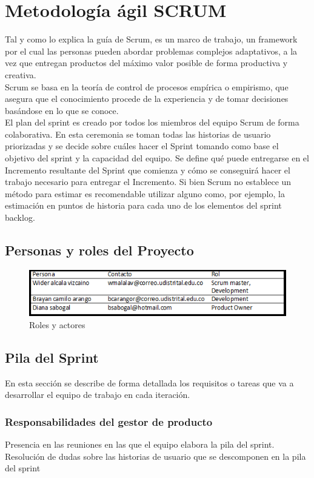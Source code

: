 \section{Metodología ágil SCRUM}

{Tal y como lo explica la guía de Scrum, es un marco de trabajo, un framework por el cual las personas pueden abordar problemas complejos adaptativos, a la vez que entregan productos del máximo valor posible de forma productiva y creativa.\\
	
Scrum se basa en la teoría de control de procesos empírica o empirismo, que asegura que el conocimiento procede de la experiencia y de tomar decisiones basándose en lo que se conoce.\\

El plan del sprint es creado por todos los miembros del equipo Scrum de forma colaborativa. En esta ceremonia se toman todas las historias de usuario priorizadas y se decide sobre cuáles hacer el Sprint tomando como base el objetivo del sprint y la capacidad del equipo. Se define qué puede entregarse en el Incremento resultante del Sprint que comienza y cómo se conseguirá hacer el trabajo necesario para entregar el Incremento. Si bien Scrum no establece un método para estimar es recomendable utilizar alguno como, por ejemplo, la estimación en puntos de historia para cada uno de los elementos del sprint backlog.

	\subsection{Personas y roles del Proyecto}
	{\begin{figure}[H]
		\centering
		\includegraphics[width=1\linewidth]{development/roles.png}
		\caption{Roles y actores}
	\end{figure}}

	\subsection{Pila del Sprint}
	{En esta sección se describe de forma detallada los requisitos o tareas que va a desarrollar el equipo de trabajo en cada iteración.
	
		\subsubsection{Responsabilidades del gestor de producto}
		{Presencia en las reuniones en las que el equipo elabora la pila del sprint. Resolución de dudas sobre las historias de usuario que se descomponen en la pila del sprint}
		
}}
